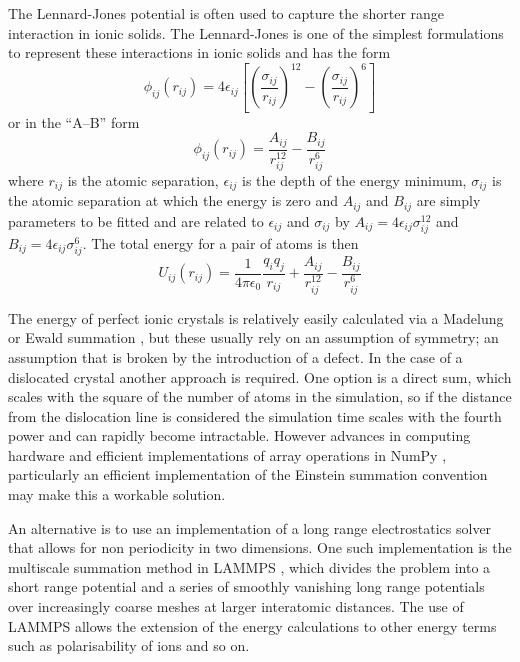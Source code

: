 The Lennard-Jones potential is often used to capture the shorter range interaction in ionic solids. The Lennard-Jones is one of the simplest formulations to represent these interactions in ionic solids and has the form
\begin{equation}
\phi_{ij}(r_{ij}) = 4\epsilon_{ij} \left[ \left( \frac{\sigma_{ij}}{r_{ij}}\right)^{12}-     \left( \frac{\sigma_{ij}}{r_{ij}}\right)^6   \right]
\end{equation}
or in the ``A--B'' form
\begin{equation}
\phi_{ij}(r_{ij}) = \frac{A_{ij}}{r_{ij}^{12}} - \frac{B_{ij}}{r_{ij}^{6}}
\end{equation}
where $r_{ij}$ is the atomic separation, $\epsilon_{ij}$ is the depth of the energy minimum, $\sigma_{ij}$ is the atomic separation at which the energy is zero and $A_{ij}$ and $B_{ij}$ are simply parameters to be fitted and are related to $\epsilon_{ij}$ and $\sigma_{ij}$ by $A_{ij} = 4\epsilon_{ij}\sigma_{ij}^{12}$ and $B_{ij} = 4 \epsilon_{ij} \sigma_{ij}^{6}$. The total energy for a pair of atoms is then
\begin{equation}
U_{ij}(r_{ij}) = \frac{1}{4\pi\epsilon_0} \frac{q_i q_j}{r_{ij}} + \frac{A_{ij}}{r_{ij}^{12}} - \frac{B_{ij}}{r_{ij}^{6}}
\end{equation}




The energy of perfect ionic crystals is relatively easily calculated  via a Madelung or Ewald summation \cite{madelung1918,Ewald1921}, but these usually rely on an assumption of symmetry; an assumption that is broken by the introduction of a defect. In the case of a dislocated crystal another approach is required. One option is a direct sum, which scales with the square of the number of atoms in the simulation, so if the distance from the dislocation line is considered the simulation time scales with the fourth power and can rapidly become intractable. However advances in computing hardware and efficient implementations of array operations in NumPy \cite{Numpy2011}, particularly an efficient implementation of the Einstein summation convention \cite{opt_einsum} may make this a workable solution.


An alternative is to use an implementation of a long range electrostatics solver that allows for non periodicity in two dimensions. One such implementation is the multiscale summation method in LAMMPS \cite{Hardy2009,LAMMPS_web}, which divides the problem into a short range potential and a series of smoothly vanishing long range potentials over increasingly coarse meshes at larger interatomic distances. The use of LAMMPS allows the extension of the energy calculations to other energy terms such as polarisability of ions and so on.


